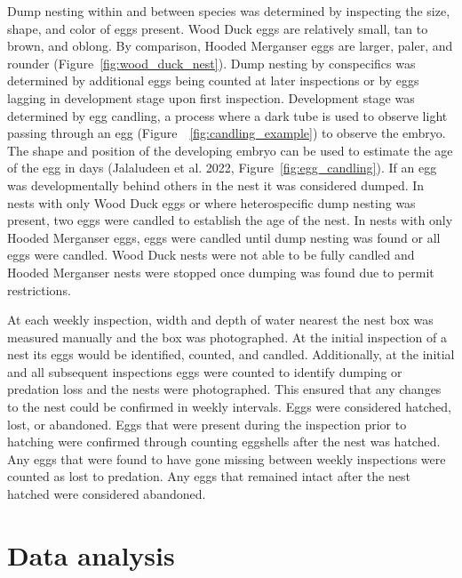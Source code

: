  

Dump nesting within and between species was determined by inspecting the size, shape, and color of eggs present. Wood Duck eggs are relatively small, tan to brown, and oblong. By comparison, Hooded Merganser eggs are larger, paler, and rounder (Figure~\ref{fig:wood_duck_nest}). Dump nesting by conspecifics was determined by additional eggs being counted at later inspections or by eggs lagging in development stage upon first inspection. Development stage was determined by egg candling, a process where a dark tube is used to observe light passing through an egg (Figure~~\ref{fig:candling_example}) to observe the embryo. The shape and position of the developing embryo can be used to estimate the age of the egg in days (Jalaludeen et al. 2022, Figure~\ref{fig:egg_candling}).  If an egg was developmentally behind others in the nest it was considered dumped. In nests with only Wood Duck eggs or where heterospecific dump nesting was present, two eggs were candled to establish the age of the nest. In nests with only Hooded Merganser eggs, eggs were candled until dump nesting was found or all eggs were candled. Wood Duck nests were not able to be fully candled and Hooded Merganser nests were stopped once dumping was found due to permit restrictions.  

 

 

 

At each weekly inspection, width and depth of water nearest the nest box was measured manually and the box was photographed. At the initial inspection of a nest its eggs would be identified, counted, and candled. Additionally, at the initial and all subsequent inspections eggs were counted to identify dumping or predation loss and the nests were photographed. This ensured that any changes to the nest could be confirmed in weekly intervals. Eggs were considered hatched, lost, or abandoned. Eggs that were present during the inspection prior to hatching were confirmed through counting eggshells after the nest was hatched. Any eggs that were found to have gone missing between weekly inspections were counted as lost to predation.  Any eggs that remained intact after the nest hatched were considered abandoned.  

\section*{Data analysis}

